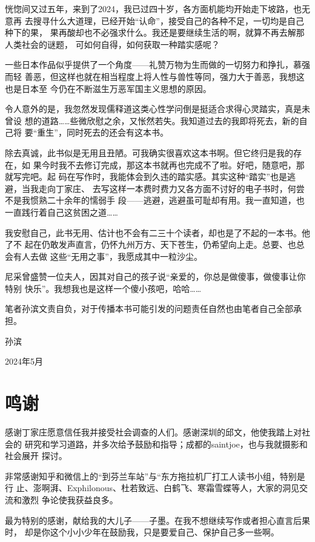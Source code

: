 恍惚间又过五年，来到了2024，我已过四十岁，各方面机能均开始走下坡路，也无意再
去搜寻什么大道理，已经开始“认命”，接受自己的各种不足，一切均是自己种下的果，
果再酸却也不必强求什么。我还是要继续生活的啊，就算不再去解那人类社会的谜题，
可如何自得，如何获取一种踏实感呢？

一些日本作品似乎提供了一个角度——礼赞万物为生而做的一切努力和挣扎，慕强而轻
善恶，但这样也就在相当程度上将人性与兽性等同，强力大于善恶，我想这也是日本至
今仍在不断滋生万恶军国主义思想的原因。

令人意外的是，我忽然发现儒释道这类心性学问倒是挺适合求得心灵踏实，真是未曾设
想的道路……些微欣慰之余，又怅然若失。我知道过去的我即将死去，新的自己将
要“重生”，同时死去的还会有这本书。

除去真诚，此书似是无用且丑陋。可我确实很喜欢这本书啊。但它终归是我的存在，如
果今时我不去修订完成，那这本书就再也完成不了啦。好吧，随意吧，那就写完吧。起
码在写作时，我能体会到久违的踏实感。其实这种“踏实”也是逃避，当我走向丁家庄、
去写这样一本费时费力又各方面不讨好的电子书时，何尝不是我惯熟二十余年的懦弱手
段——逃避，逃避虽可耻却有用。我一直知道，也一直践行着自己这贫困之道……

我安慰自己，此书无用、估计也不会有二三十个读者，却也是了不起的一本书。他了不
起在仍敢发声直言，仍怀九州万方、天下苍生，仍希望向上走。总要、也总会有人去做
这些“无用之事”，我愿成其中一粒沙尘。


尼采曾盛赞一位夫人，因其对自己的孩子说“亲爱的，你总是做傻事，做傻事让你特别
快乐”。我想我也是这样一个傻小孩吧，哈哈……

笔者孙滨文责自负，对于传播本书可能引发的问题责任自然也由笔者自己全部承担。

{\raggedleft

孙滨 \qquad\qquad

2024年5月 \quad}

\chapter{鸣谢}

感谢丁家庄愿意信任我并接受社会调查的人们。感谢深圳的邱文，他使我踏上对社会的
研究和学习道路，并多次给予鼓励和指导；成都的saintjoe，也与我就摄影和社会展开
探讨。

非常感谢知乎和微信上的“到芬兰车站”与“东方拖拉机厂打工人读书小组，特别是行
止、澎啊湃、Exphilonous、杜若致远、白鹤飞、寒霜雪蝶等人，大家的洞见交流和激烈
争论使我获益良多。


最为特别的感谢，献给我的大儿子——子墨。在我不想继续写作或者担心直言后果时，
却是你这个小小少年在鼓励我，只是要爱自己、保护自己多一些啊。

